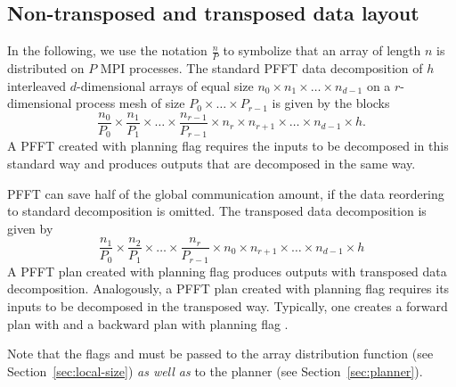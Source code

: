 \subsection{Non-transposed and transposed data layout}
In the following, we use the notation $\frac{n}{P}$ to symbolize that an array of length $n$ is distributed on $P$ MPI processes.
The standard PFFT data decomposition of $h$ interleaved $d$-dimensional arrays of equal size $n_0 \times n_1\times \hdots \times n_{d-1}$
on a $r$-dimensional process mesh of size $P_0\times \hdots \times P_{r-1}$ is given by the blocks
\begin{equation*}
  \frac{n_0}{P_0} \times \frac{n_1}{P_1} \times \hdots \times \frac{n_{r-1}}{P_{r-1}}  \times n_r \times n_{r+1} \times \hdots \times n_{d-1} \times h.
\end{equation*}
A PFFT created with planning flag  requires the inputs to be decomposed in this standard way and produces
outputs that are decomposed in the same way.

PFFT can save half of the global communication amount, if the data reordering to standard decomposition is omitted. 
The transposed data decomposition is given by
\begin{equation*}
  \frac{n_1}{P_0} \times \frac{n_2}{P_1} \times \hdots \times \frac{n_{r}}{P_{r-1}}  \times n_0 \times n_{r+1} \times \hdots \times n_{d-1} \times h
\end{equation*}
A PFFT plan created with planning flag  produces outputs with transposed data decomposition.
Analogously, a PFFT plan created with planning flag  requires its inputs to be decomposed in the transposed way.
Typically, one creates a forward plan with  and a backward plan with planning flag .

Note that the flags  and  must be passed to the array distribution function (see Section~\ref{sec:local-size})
\emph{as well as} to the planner (see Section~\ref{sec:planner}).

